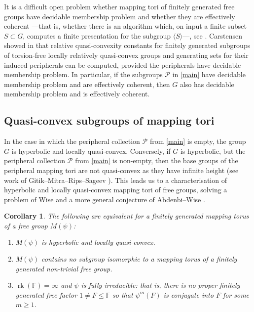 \documentclass[11pt, a4paper]{amsart}
\newtheorem{corollary}[theorem]{Corollary}
\theoremstyle{definition}
\newcommand{\F}{\mathbb{F}}
\DeclareMathOperator{\rk}{rk}
\begin{document}
It is a difficult open problem whether mapping tori of finitely generated free groups have decidable membership problem and whether they are effectively coherent ---that is, whether there is an algorithm which, on input a finite subset $S\subset G$, computes a finite presentation for the subgroup $\langle S\rangle$---, see \cite{Ka00,Aim23}. Carstensen showed in \cite{Ca22} that relative quasi-convexity constants for finitely generated subgroups of torsion-free locally relatively quasi-convex groups and generating sets for their induced peripherals can be computed, provided the peripherals have decidable membership problem. In particular, if the subgroups $\mathcal{P}$ in \cref{main} have decidable membership problem and are effectively coherent, then $G$ also has decidable membership problem and is effectively coherent.


\subsection{Quasi-convex subgroups of mapping tori}

In the case in which the peripheral collection $\mathcal{P}$ from \cref{main} is empty, the group $G$ is hyperbolic and locally quasi-convex. Conversely, if $G$ is hyperbolic, but the peripheral collection $\mathcal{P}$ from \cref{main} is non-empty, then the base groups of the peripheral mapping tori are not quasi-convex as they have infinite height (see work of Gitik--Mitra--Rips--Sageev \cite{GMRS98}). This leads us to a characterisation of hyperbolic and locally quasi-convex mapping tori of free groups, solving a problem of Wise \cite[Problem 17]{Wi20} and a more general conjecture of Abdenbi--Wise \cite[Conjecture 6.1]{AW23}.


\begin{corollary}
\label{cor:lqh}
The following are equivalent for a finitely generated mapping torus of a free group $M(\psi)$:
\begin{enumerate}
\item $M(\psi)$ is hyperbolic and locally quasi-convex.
\item $M(\psi)$ contains no subgroup isomorphic to a mapping torus of a finitely generated non-trivial free group.
\item $\rk(\F) = \infty$ and $\psi$ is \emph{fully irreducible}: that is, there is no proper finitely generated free factor $1\neq F\leqslant \F$ so that $\psi^m(F)$ is conjugate into $F$ for some $m\geqslant 1$.
\end{enumerate}
\end{corollary}
\end{document}
